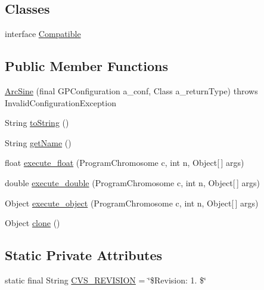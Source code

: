 \subsection*{Classes}
\begin{DoxyCompactItemize}
\item 
interface \hyperlink{interfaceorg_1_1jgap_1_1gp_1_1function_1_1_arc_sine_1_1_compatible}{Compatible}
\end{DoxyCompactItemize}
\subsection*{Public Member Functions}
\begin{DoxyCompactItemize}
\item 
\hyperlink{classorg_1_1jgap_1_1gp_1_1function_1_1_arc_sine_ae41dc3953b33040d4107482127d5bb7d}{Arc\-Sine} (final G\-P\-Configuration a\-\_\-conf, Class a\-\_\-return\-Type)  throws Invalid\-Configuration\-Exception 
\item 
String \hyperlink{classorg_1_1jgap_1_1gp_1_1function_1_1_arc_sine_a7ed9f247e02cf756cea05e2d2c5e4df7}{to\-String} ()
\item 
String \hyperlink{classorg_1_1jgap_1_1gp_1_1function_1_1_arc_sine_ab254db7227acec95c5014bf041237129}{get\-Name} ()
\item 
float \hyperlink{classorg_1_1jgap_1_1gp_1_1function_1_1_arc_sine_a244666f876073e0b20b898af65e69e4f}{execute\-\_\-float} (Program\-Chromosome c, int n, Object\mbox{[}$\,$\mbox{]} args)
\item 
double \hyperlink{classorg_1_1jgap_1_1gp_1_1function_1_1_arc_sine_a011fdac96c4e256080e0312b8593fdfe}{execute\-\_\-double} (Program\-Chromosome c, int n, Object\mbox{[}$\,$\mbox{]} args)
\item 
Object \hyperlink{classorg_1_1jgap_1_1gp_1_1function_1_1_arc_sine_af9915a7273e79f4ad74cd4e836255c69}{execute\-\_\-object} (Program\-Chromosome c, int n, Object\mbox{[}$\,$\mbox{]} args)
\item 
Object \hyperlink{classorg_1_1jgap_1_1gp_1_1function_1_1_arc_sine_a04e83f357275b8636df5ab66b8e43367}{clone} ()
\end{DoxyCompactItemize}
\subsection*{Static Private Attributes}
\begin{DoxyCompactItemize}
\item 
static final String \hyperlink{classorg_1_1jgap_1_1gp_1_1function_1_1_arc_sine_a6bbc43a5bdd3ac43cbdb749cfb1afcf5}{C\-V\-S\-\_\-\-R\-E\-V\-I\-S\-I\-O\-N} = \char`\"{}\$Revision\-: 1. \$\char`\"{}
\end{DoxyCompactItemize}
